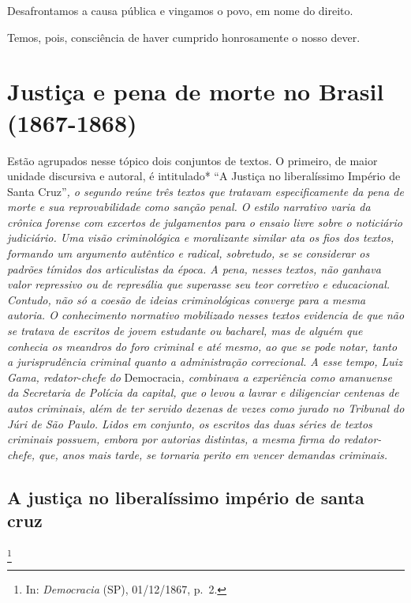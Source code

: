 Desafrontamos a causa pública e vingamos o povo, em nome do direito.

Temos, pois, consciência de haver cumprido honrosamente o nosso dever.

\part{Justiça e pena de morte no Brasil (1867-1868)}

\begin{didascalia}
Estão agrupados nesse tópico dois conjuntos de textos. O primeiro, de
maior unidade discursiva e autoral, é intitulado* ``A Justiça no
liberalíssimo Império de Santa Cruz''\emph{, o segundo reúne três textos
que tratavam especificamente da pena de morte e sua reprovabilidade como
sanção penal. O estilo narrativo varia da crônica forense com excertos
de julgamentos para o ensaio livre sobre o noticiário judiciário. Uma
visão criminológica e moralizante similar ata os fios dos textos,
formando um argumento autêntico e radical, sobretudo, se se considerar
os padrões tímidos dos articulistas da época. A pena, nesses textos, não
ganhava valor repressivo ou de represália que superasse seu teor
corretivo e educacional. Contudo, não só a coesão de ideias
criminológicas converge para a mesma autoria. O conhecimento normativo
mobilizado nesses textos evidencia de que não se tratava de escritos de
jovem estudante ou bacharel, mas de alguém que conhecia os meandros do
foro criminal e até mesmo, ao que se pode notar, tanto a jurisprudência
criminal quanto a administração correcional. A esse tempo, Luiz Gama,
redator-chefe do} Democracia\emph{, combinava a experiência como
amanuense da Secretaria de Polícia da capital, que o levou a lavrar e
diligenciar centenas de autos criminais, além de ter servido dezenas de
vezes como jurado no Tribunal do Júri de São Paulo. Lidos em conjunto,
os escritos das duas séries de textos criminais possuem, embora por
autorias distintas, a mesma firma do redator-chefe, que, anos mais
tarde, se tornaria perito em vencer demandas criminais.}
\end{didascalia}

\chapter{A justiça no liberalíssimo império de santa cruz}\footnote{In:
  \emph{Democracia} (SP), 01/12/1867, p.~2.}

